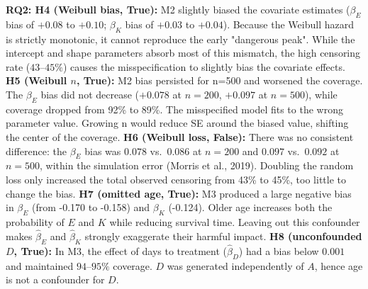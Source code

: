 \documentclass[10pt,a4paper]{article}
\begin{document}
\textbf{RQ2: H4 (Weibull bias, True):} M2 slightly biased the covariate estimates ($\beta_E$ bias of $+0.08$ to $+0.10$; $\beta_K$ bias of $+0.03$ to $+0.04$). Because the Weibull hazard is strictly monotonic, it cannot reproduce the early "dangerous peak". While the intercept and shape parameters absorb most of this mismatch, the high censoring rate ($43\text{--}45\%$) causes the misspecification to slightly bias the covariate effects.
\textbf{H5 (Weibull $n$, True):} M2 bias persisted for n=500 and worsened the coverage. The $\beta_E$ bias did not decrease ($+0.078$ at $n=200$, $+0.097$ at $n=500$), while coverage dropped from 92\% to 89\%. The misspecified model fits to the wrong parameter value. Growing n would reduce SE around the biased value, shifting the center of the coverage.
\textbf{H6 (Weibull loss, False):} There was no consistent difference: the $\beta_E$ bias was $0.078$ vs.\ $0.086$ at $n=200$ and $0.097$ vs.\ $0.092$ at $n=500$, within the simulation error (Morris et al., 2019). Doubling the random loss only increased the total observed censoring from 43\% to 45\%, too little to change the bias.
\textbf{H7 (omitted age, True):} M3 produced a large negative bias in $\beta_E$ (from -0.170 to -0.158) and $\beta_K$ (-0.124). Older age increases both the probability of $E$ and $K$ while reducing survival time. Leaving out this confounder makes $\hat{\beta}_E$ and $\hat{\beta}_K$ strongly exaggerate their harmful impact.
\textbf{H8 (unconfounded $D$, True):} In M3, the effect of days to treatment ($\hat{\beta}_D$) had a bias below $0.001$ and maintained $94\text{--}95\%$ coverage. $D$ was generated independently of $A$, hence age is not a confounder for $D$.
\end{document}
